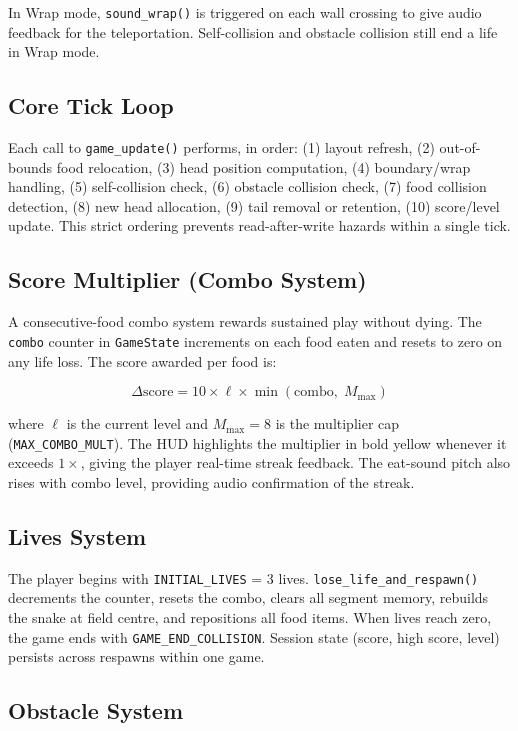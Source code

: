 \documentclass[conference]{IEEEtran}
\begin{document}
In Wrap mode, \texttt{sound\_wrap()} is triggered on each wall crossing to
give audio feedback for the teleportation. Self-collision and obstacle
collision still end a life in Wrap mode.

\subsection{Core Tick Loop}

Each call to \texttt{game\_update()} performs, in order:
(1) layout refresh, (2) out-of-bounds food relocation, (3) head position
computation, (4) boundary/wrap handling, (5) self-collision check,
(6) obstacle collision check, (7) food collision detection, (8) new head
allocation, (9) tail removal or retention, (10) score/level update.
This strict ordering prevents read-after-write hazards within a single tick.

\subsection{Score Multiplier (Combo System)}
\label{sec:multiplier}

A consecutive-food combo system rewards sustained play without dying. The
\texttt{combo} counter in \texttt{GameState} increments on each food eaten and
resets to zero on any life loss. The score awarded per food is:

\[
  \Delta\text{score} = 10 \times \ell \times \min(\text{combo},\; M_{\max})
\]

where $\ell$ is the current level and $M_{\max} = 8$ is the multiplier cap
(\texttt{MAX\_COMBO\_MULT}). The HUD highlights the multiplier in bold yellow
whenever it exceeds $1\times$, giving the player real-time streak feedback.
The eat-sound pitch also rises with combo level, providing audio confirmation
of the streak.

\subsection{Lives System}

The player begins with \texttt{INITIAL\_LIVES} = 3 lives.
\texttt{lose\_life\_and\_respawn()} decrements the counter, resets the combo,
clears all segment memory, rebuilds the snake at field centre, and repositions
all food items. When lives reach zero, the game ends with
\texttt{GAME\_END\_COLLISION}. Session state (score, high score, level)
persists across respawns within one game.

\subsection{Obstacle System}
\end{document}
